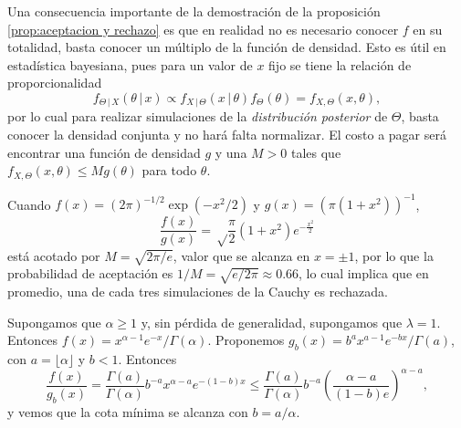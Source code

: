Una consecuencia importante de la demostración de la proposición \ref{prop:aceptacion y rechazo} es que en realidad no es necesario conocer $f$ en su totalidad, basta conocer un múltiplo de la función de densidad. Esto es útil en estadística bayesiana, pues para un valor de $x$ fijo se tiene la relación de proporcionalidad
\[
    f_{\Theta \,\vert\, X}(\theta \,\vert\, x) \propto f_{X \,\vert\, \Theta}(x \,\vert\, \theta) f_\Theta(\theta) = f_{X, \Theta}(x, \theta),
\]
por lo cual para realizar simulaciones de la \emph{distribución posterior} de $\Theta$, basta conocer la densidad conjunta y no hará falta normalizar. El costo a pagar será encontrar una función de densidad $g$ y una $M > 0$ tales que $f_{X, \Theta}(x, \theta) \leq M g(\theta)$ para todo $\theta$.

\begin{example}
    Cuando $f(x) = (2\pi)^{-1/2} \exp(-x^2/2)$ y $g(x) = (\pi(1+x^2))^{-1}$,
    \[
        \frac{f(x)}{g(x)} = \sqrt\frac{\pi}{2} (1+x^2) e^{-\frac{x^2}{2}}
    \]
    está acotado por $M = \sqrt{2\pi/e}$, valor que se alcanza en $x = \pm 1$, por lo que la probabilidad de aceptación es $1/M = \sqrt{e/2\pi} \approx 0.66$, lo cual implica que en promedio, una de cada tres simulaciones de la Cauchy es rechazada.
\end{example}

\begin{example}
    Supongamos que $\alpha \geq 1$ y, sin pérdida de generalidad, supongamos que $\lambda = 1$. Entonces $f(x) = x^{\alpha - 1} e^{-x} / \Gamma(\alpha)$. Proponemos $g_b(x) = b^a x^{a-1} e^{-bx} / \Gamma(a)$, con $a = \lfloor \alpha \rfloor$ y $b < 1$. Entonces 
    \[
        \frac{f(x)}{g_b(x)} = \frac{\Gamma(a)}{\Gamma(\alpha)} b^{-a} x^{\alpha - a} e^{-(1-b)x} \leq \frac{\Gamma(a)}{\Gamma(\alpha)} b^{-a} \left( \frac{\alpha-a}{(1-b)e} \right)^{\alpha-a},
    \]
    y vemos que la cota mínima se alcanza con $b = a / \alpha$.
\end{example}